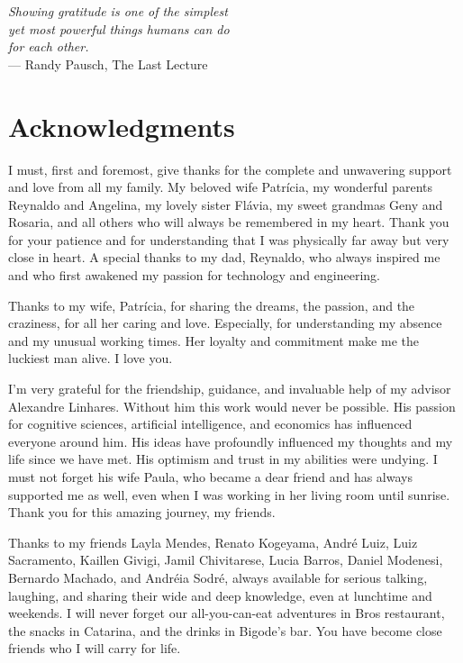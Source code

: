
\begin{flushright}{\slshape
	Showing gratitude is one of the simplest\\
    yet most powerful things humans can do\\
    for each other.} \\ \medskip
    --- Randy Pausch, The Last Lecture
\end{flushright}

\bigskip

\begingroup
\let\clearpage\relax
\let\cleardoublepage\relax
\let\cleardoublepage\relax
\chapter*{Acknowledgments}

I must, first and foremost, give thanks for the complete and unwavering support and love from all my family. My beloved wife Patrícia, my wonderful parents Reynaldo and Angelina, my lovely sister Flávia, my sweet grandmas Geny and Rosaria, and all others who will always be remembered in my heart. Thank you for your patience and for understanding that I was physically far away but very close in heart. A special thanks to my dad, Reynaldo, who always inspired me and who first awakened my passion for technology and engineering.

Thanks to my wife, Patrícia, for sharing the dreams, the passion, and the craziness, for all her caring and love. Especially, for understanding my absence and my unusual working times. Her loyalty and commitment make me the luckiest man alive. I love you.

I'm very grateful for the friendship, guidance, and invaluable help of my advisor Alexandre Linhares. Without him this work would never be possible. His passion for cognitive sciences, artificial intelligence, and economics has influenced everyone around him. His ideas have profoundly influenced my thoughts and my life since we have met. His optimism and trust in my abilities were undying. I must not forget his wife Paula, who became a dear friend and has always supported me as well, even when I was working in her living room until sunrise. Thank you for this amazing journey, my friends.

Thanks to my friends Layla Mendes, Renato Kogeyama, André Luiz, Luiz Sacramento, Kaillen Givigi, Jamil Chivitarese, Lucia Barros, Daniel Modenesi, Bernardo Machado, and Andréia Sodré, always available for serious talking, laughing, and sharing their wide and deep knowledge, even at lunchtime and weekends. I will never forget our all-you-can-eat adventures in Bros restaurant, the snacks in Catarina, and the drinks in Bigode's bar. You have become close friends who I will carry for life.

